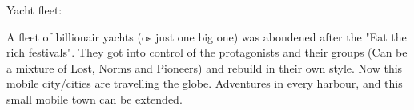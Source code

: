 Yacht fleet:

A fleet of billionair yachts (os just one big one) was abondened after the "Eat the rich festivals". They got into control of the protagonists and their groups (Can be a mixture of Lost, Norms and Pioneers) and rebuild in their own style. Now this mobile city/cities are travelling the globe. Adventures in every harbour, and this small mobile town can be extended.